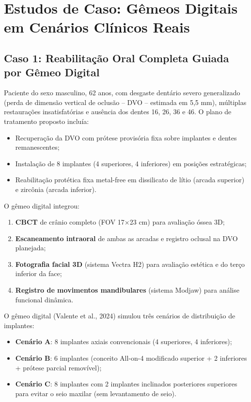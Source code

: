 
\section{Estudos de Caso: Gêmeos Digitais em Cenários Clínicos Reais}

\subsection{Caso 1: Reabilitação Oral Completa Guiada por Gêmeo Digital}

Paciente do sexo masculino, 62 anos, com desgaste dentário severo generalizado (perda de dimensão vertical de oclusão -- DVO -- estimada em 5,5 mm), múltiplas restaurações insatisfatórias e ausência dos dentes 16, 26, 36 e 46. O plano de tratamento proposto incluía:
\begin{itemize}
    \item Recuperação da DVO com prótese provisória fixa sobre implantes e dentes remanescentes;
    \item Instalação de 8 implantes (4 superiores, 4 inferiores) em posições estratégicas;
    \item Reabilitação protética fixa metal-free em dissilicato de lítio (arcada superior) e zircônia (arcada inferior).
\end{itemize}

O gêmeo digital integrou:
\begin{enumerate}
    \item \textbf{CBCT} de crânio completo (FOV 17$\times$23 cm) para avaliação óssea 3D;
    \item \textbf{Escaneamento intraoral} de ambas as arcadas e registro oclusal na DVO planejada;
    \item \textbf{Fotografia facial 3D} (sistema Vectra H2) para avaliação estética e do terço inferior da face;
    \item \textbf{Registro de movimentos mandibulares} (sistema Modjaw) para análise funcional dinâmica.
\end{enumerate}

O gêmeo digital (Valente et al., 2024) simulou três cenários de distribuição de implantes:
\begin{itemize}
    \item \textbf{Cenário A}: 8 implantes axiais convencionais (4 superiores, 4 inferiores);
    \item \textbf{Cenário B}: 6 implantes (conceito All-on-4 modificado superior + 2 inferiores + prótese parcial removível);
    \item \textbf{Cenário C}: 8 implantes com 2 implantes inclinados posteriores superiores para evitar o seio maxilar (sem levantamento de seio).
\end{itemize}

